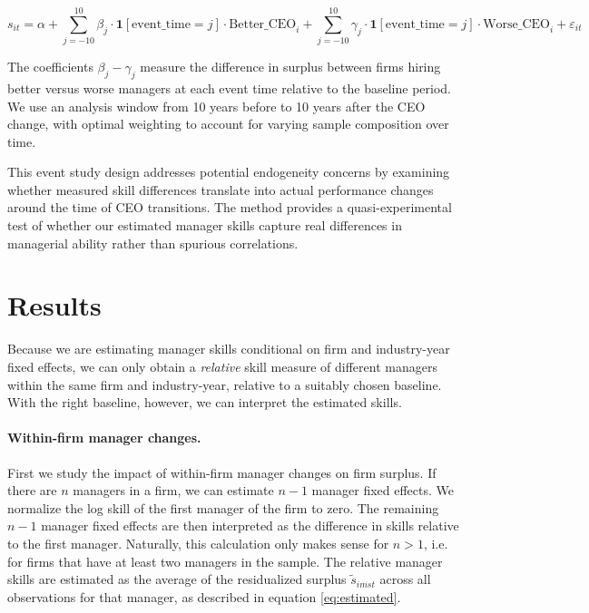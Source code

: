 \documentclass[11pt,a4paper]{article}
\begin{document}
\begin{equation}
s_{it} = \alpha + \sum_{j=-10}^{10} \beta_j \cdot \mathbf{1}[\text{event\_time} = j] \cdot \text{Better\_CEO}_i + \sum_{j=-10}^{10} \gamma_j \cdot \mathbf{1}[\text{event\_time} = j] \cdot \text{Worse\_CEO}_i + \varepsilon_{it}
\end{equation}

The coefficients $\beta_j - \gamma_j$ measure the difference in surplus between firms hiring better versus worse managers at each event time relative to the baseline period. We use an analysis window from 10 years before to 10 years after the CEO change, with optimal weighting to account for varying sample composition over time.

This event study design addresses potential endogeneity concerns by examining whether measured skill differences translate into actual performance changes around the time of CEO transitions. The method provides a quasi-experimental test of whether our estimated manager skills capture real differences in managerial ability rather than spurious correlations.

\section{Results}

Because we are estimating manager skills conditional on firm and industry-year fixed effects, we can only obtain a \emph{relative} skill measure of different managers within the same firm and industry-year, relative to a suitably chosen baseline. With the right baseline, however, we can interpret the estimated skills.

\paragraph{Within-firm manager changes.}
First we study the impact of within-firm manager changes on firm surplus. If there are $n$ managers in a firm, we can estimate $n-1$ manager fixed effects. We normalize the log skill of the first manager of the firm to zero. The remaining $n-1$ manager fixed effects are then interpreted as the difference in skills relative to the first manager. Naturally, this calculation only makes sense for $n>1$, i.e. for firms that have at least two managers in the sample. The relative manager skills are estimated as the average of the residualized surplus $\tilde s_{imst}$ across all observations for that manager, as described in equation \eqref{eq:estimated}. 
\end{document}
